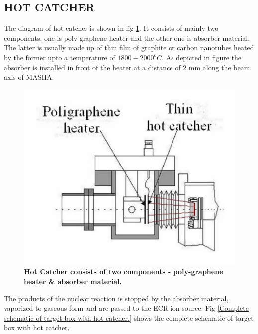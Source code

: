 \documentclass[12pt]{article}
\begin{document}
\subsection{HOT CATCHER}
The diagram of hot catcher is shown in fig \ref{Hot Catcher consists of two components-poly-graphene heater & absorber material.}. It consists of mainly two components, one is poly-graphene heater and the other one is absorber material. The latter is usually made up of thin film of graphite or carbon nanotubes heated by the former upto a temperature of $1800-2000^oC$. As depicted in figure the absorber is installed in front of the heater at a distance of 2 mm along the beam axis of MASHA\cite{mamatova2019study}. 
\begin{figure}[h]
\centering
\includegraphics[scale=0.5]{HC.png}
\caption{\textbf{Hot Catcher consists of two components - poly-graphene heater \& absorber material.}}
\label{Hot Catcher consists of two components-poly-graphene heater & absorber material.}
\end{figure}
The products of the nuclear reaction is stopped by the absorber material, vaporized to gaseous form and are passed to the ECR ion source. Fig \ref{Complete schematic of target box with hot catcher.} shows the complete schematic of target box with hot catcher.
\end{document}
